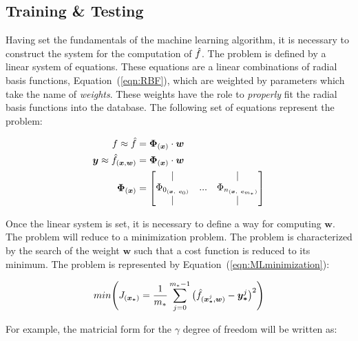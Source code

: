 \subsection{Training \& Testing}

Having set the fundamentals of the machine learning algorithm, it is necessary to construct the system for the 
computation of $\hat{\mathnormal{f}}$. The problem is defined by a linear system of equations.
These equations are a linear combinations of radial basis functions, Equation~(\ref{eqn:RBF}), which are 
weighted by parameters which take the name of \textit{weights}. These weights have the role to 
\textit{properly} fit the radial basis functions into the database.
The following set of equations represent the problem: 

\begin{align}
    \mathnormal{f} \approx \hat{\mathnormal{f}} & = \boldsymbol{\Phi}_{(\boldsymbol{x})} \cdot \boldsymbol{w} \\
    \boldsymbol{y} \approx \hat{\mathnormal{f}}_{(\boldsymbol{x}, \boldsymbol{w})} & = \boldsymbol{\Phi}_{(\boldsymbol{x})} \cdot \boldsymbol{w} \\ 
    \boldsymbol{\Phi}_{(\boldsymbol{x})} & = 
    \begin{bmatrix}
        \lvert &  & \lvert \\ 
        \Phi_{0_{ ( \boldsymbol{x}, \ \boldsymbol{c}_0 ) } } & ... & \Phi_{n_{ ( \boldsymbol{x}, \ \boldsymbol{c}_{m_*} ) } } \\
        \lvert &  & \lvert 
    \end{bmatrix}
    \label{eqn:phi}
\end{align}

Once the linear system is set, it is necessary to define a way for computing $\boldsymbol{w}$.
The problem will reduce to a minimization problem. The problem is characterized by the search of
the weight $\boldsymbol{w}$ such that a cost function is reduced to its minimum. The problem is 
represented by Equation~(\ref{eqn:MLminimization}):

\begin{equation}
    min \Bigg( J_{(\boldsymbol{x_*})} = \frac{1}{m_*} \sum^{m_* - 1}_{j = 0} \big( \hat{\mathnormal{f}}_{ (\boldsymbol{x}^{j}_{\boldsymbol{*}}, \boldsymbol{w})} - \boldsymbol{y}^{j}_{\boldsymbol{*}}\big)^2 \Bigg)
    \label{eqn:MLminimization}
\end{equation}

For example, the matricial form for the $\gamma$ degree of freedom will be written as:

